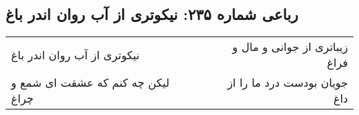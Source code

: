 \begin{center}
\section*{رباعی شماره ۲۳۵: نیکوتری از آب روان اندر باغ}
\label{sec:sh235}
\begin{longtable}{l p{0.5cm} r}
نیکوتری از آب روان اندر باغ
&&
زیباتری از جوانی و مال و فراغ
\\
لیکن چه کنم که عشقت ای شمع و چراغ
&&
جویان بودست درد ما را از داغ
\\
\end{longtable}
\end{center}
